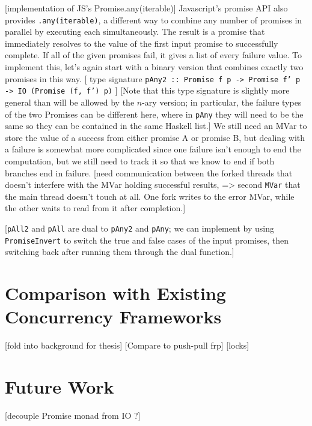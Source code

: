\documentclass[12pt, english, letterpaper]{kuthesis}
\newcommand{\lit}[1]{\texttt{#1}}
\begin{document}
[implementation of JS's Promise.any(iterable)] Javascript's promise API also provides \lit{.any(iterable)}, a different way to combine any number of promises in parallel by executing each simultaneously.  The result is a promise that immediately resolves to the value of the first input promise to successfully complete.  If all of the given promises fail, it gives a list of every failure value.  To implement this, let's again start with a binary version that combines exactly two promises in this way.  [ type signature \lit{pAny2 :: Promise f p -> Promise f' p -> IO (Promise (f, f') p)} ] [Note that this type signature is slightly more general than will be allowed by the \(n\)-ary version; in particular, the failure types of the two Promises can be different here, where in \lit{pAny} they will need to be the same so they can be contained in the same Haskell list.]  We still need an MVar to store the value of a success from either promise A or promise B, but dealing with a failure is somewhat more complicated since one failure isn't enough to end the computation, but we still need to track it so that we know to end if both branches end in failure. [need communication between the forked threads that doesn't interfere with the MVar holding successful results, => second \lit{MVar} that the main thread doesn't touch at all.  One fork writes to the error MVar, while the other waits to read from it after completion.]

[\lit{pAll2} and \lit{pAll} are dual to \lit{pAny2} and \lit{pAny}; we can implement by using \lit{PromiseInvert} to switch the true and false cases of the input promises, then switching back after running them through the dual function.]

\chapter{Comparison with Existing Concurrency Frameworks}
[fold into background for thesis]
[Compare to push-pull frp]
[locks]

\chapter{Future Work}

[decouple Promise monad from IO ?]
\end{document}
